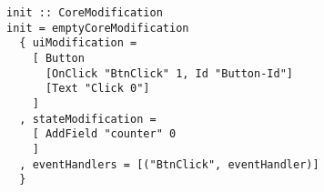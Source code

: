 \begin{verbatim}
init :: CoreModification
init = emptyCoreModification
  { uiModification =
    [ Button
      [OnClick "BtnClick" 1, Id "Button-Id"]
      [Text "Click 0"]
    ]
  , stateModification =
    [ AddField "counter" 0
    ]
  , eventHandlers = [("BtnClick", eventHandler)]
  }
\end{verbatim}
